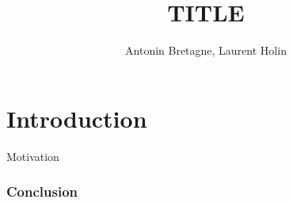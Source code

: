 \documentclass[aspectratio=169, 10pt, french]{beamer}
\title{TITLE}
\author{Antonin Bretagne, Laurent Holin}
\institute
{
Dans le cadre du cours de Deep Learning
}
\begin{document}
\maketitle



\section[Introduction]{Introduction}

\begin{frame}

\begin{center}
{\LARGE
Motivation



}
\end{center}

\end{frame}



\begin{frame}
\frametitle{Conclusion}

\end{frame}
\end{document}
